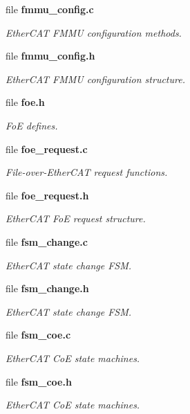 \begin{DoxyCompactItemize}
file {\bf fmmu\-\_\-config.\-c}
\begin{DoxyCompactList}\small\item\em Ether\-C\-A\-T F\-M\-M\-U configuration methods. \end{DoxyCompactList}\item 
file {\bf fmmu\-\_\-config.\-h}
\begin{DoxyCompactList}\small\item\em Ether\-C\-A\-T F\-M\-M\-U configuration structure. \end{DoxyCompactList}\item 
file {\bf foe.\-h}
\begin{DoxyCompactList}\small\item\em Fo\-E defines. \end{DoxyCompactList}\item 
file {\bf foe\-\_\-request.\-c}
\begin{DoxyCompactList}\small\item\em File-\/over-\/\-Ether\-C\-A\-T request functions. \end{DoxyCompactList}\item 
file {\bf foe\-\_\-request.\-h}
\begin{DoxyCompactList}\small\item\em Ether\-C\-A\-T Fo\-E request structure. \end{DoxyCompactList}\item 
file {\bf fsm\-\_\-change.\-c}
\begin{DoxyCompactList}\small\item\em Ether\-C\-A\-T state change F\-S\-M. \end{DoxyCompactList}\item 
file {\bf fsm\-\_\-change.\-h}
\begin{DoxyCompactList}\small\item\em Ether\-C\-A\-T state change F\-S\-M. \end{DoxyCompactList}\item 
file {\bf fsm\-\_\-coe.\-c}
\begin{DoxyCompactList}\small\item\em Ether\-C\-A\-T Co\-E state machines. \end{DoxyCompactList}\item 
file {\bf fsm\-\_\-coe.\-h}
\begin{DoxyCompactList}\small\item\em Ether\-C\-A\-T Co\-E state machines. \end{DoxyCompactList}\item 

\end{DoxyCompactItemize}
